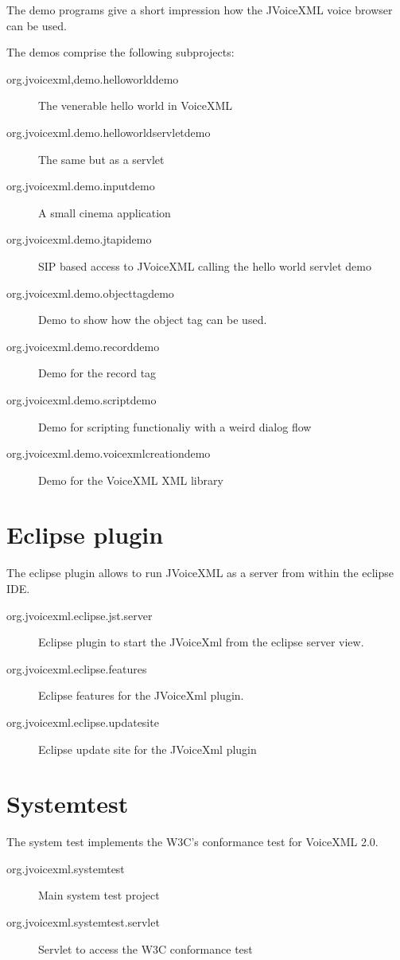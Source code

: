 \documentclass[11pt,a4paper]{article}
\begin{document}
The demo programs give a short impression how the JVoiceXML voice browser can
be used.

The demos comprise the following subprojects:

\begin{description}
\item[org.jvoicexml,demo.helloworlddemo] The venerable hello world in VoiceXML
\item[org.jvoicexml.demo.helloworldservletdemo] The same but as a servlet
\item[org.jvoicexml.demo.inputdemo] A small cinema application
\item[org.jvoicexml.demo.jtapidemo] SIP based access to JVoiceXML calling the
hello world servlet demo
\item[org.jvoicexml.demo.objecttagdemo] Demo to show how the object tag can be
used.
\item[org.jvoicexml.demo.recorddemo] Demo for the record tag
\item[org.jvoicexml.demo.scriptdemo] Demo for scripting functionaliy with a
weird dialog flow
\item[org.jvoicexml.demo.voicexmlcreationdemo] Demo for the VoiceXML XML library
\end{description}

\section{Eclipse plugin}

The eclipse plugin allows to run JVoiceXML as a server from within the eclipse
IDE.

\begin{description}
\item[org.jvoicexml.eclipse.jst.server] Eclipse plugin to start the JVoiceXml
from the eclipse server view.
\item[org.jvoicexml.eclipse.features] Eclipse features for the JVoiceXml
plugin.
\item[org.jvoicexml.eclipse.updatesite] Eclipse update site for the
JVoiceXml plugin
\end{description}

\section{Systemtest}

The system test implements the W3C's conformance test for VoiceXML 2.0.

\begin{description}
\item[org.jvoicexml.systemtest] Main system test project
\item[org.jvoicexml.systemtest.servlet] Servlet to access the W3C conformance
test
\end{description}
\end{document}
